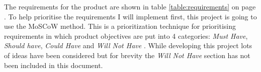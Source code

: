 \documentclass{UoYCSproject}
\begin{document}
The requirements for the product are shown in table \ref{table:requirements} on page \pageref{table:requirements}. To help  prioritise the requirements I will implement first, this project is going to use the MoSCoW method. This is a prioritization technique for prioritising requirements in which product objectives are put into 4 categories: \textit{Must Have}, \textit{Should have}, \textit{Could Have} and \textit{Will Not Have} \cite{MoSCoW_productplan_2018}. While developing this project lots of ideas have been considered but for brevity the \textit{Will Not Have} section has not been included in this document. 


\begin{table}[htb]
\label{table:requirements}
\begin{center}
\end{center}
\end{table}
\end{document}
